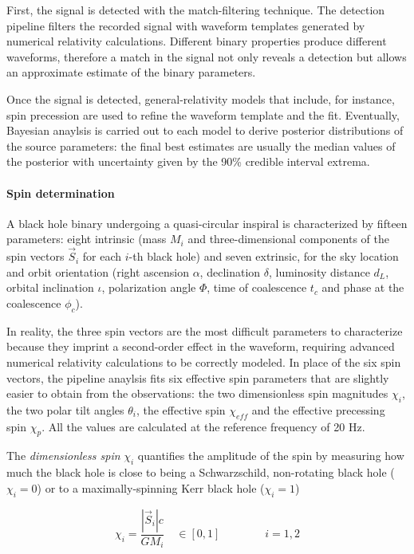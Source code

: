 \documentclass[a4paper,titlepage]{book}     	%
\begin{document}
First, the signal is detected with the match-filtering technique. The detection pipeline filters the recorded signal with waveform templates generated by numerical relativity calculations. Different binary properties produce different waveforms, therefore a match in the signal not only reveals a detection but allows an approximate estimate of the binary parameters.

Once the signal is detected, general-relativity models that include, for instance, spin precession are used to refine the waveform template and the fit. Eventually, Bayesian anaylsis is carried out to each model to derive posterior distributions of the source parameters: the final best estimates are usually the median values of the posterior with uncertainty given by the 90\% credible interval extrema.

\paragraph{Spin determination} A black hole binary undergoing a quasi-circular inspiral is characterized by fifteen parameters: eight intrinsic (mass $M_i$ and three-dimensional components of the spin vectors $\vec{S}_i$ for each $i$-th black hole) and seven extrinsic, for the sky location and orbit orientation (right ascension $\alpha$, declination $\delta$, luminosity distance $d_L$, orbital inclination $\iota$, polarization angle $\Phi$, time of coalescence $t_c$ and phase at the coalescence $\phi_c$). \cite{GWTC-1}

In reality, the three spin vectors are the most difficult parameters to characterize because they imprint a second-order effect in the waveform, requiring advanced numerical relativity calculations to be correctly modeled. In place of the six spin vectors, the pipeline anaylsis fits six effective spin parameters that are slightly easier to obtain from the observations: the two dimensionless spin magnitudes $\chi_i$, the two polar tilt angles $\theta_i$, the effective spin $\chi_{eff}$ and the effective precessing spin $\chi_p$. All the values are calculated at the reference frequency of 20 Hz.

The \emph{dimensionless spin} $\chi_i$ quantifies the amplitude of the spin by measuring how much the black hole is close to being a Schwarzschild, non-rotating black hole ($\chi_i = 0$) or to a maximally-spinning Kerr black hole ($\chi_i = 1$)

\begin{equation}\label{eq:chispin}
	\chi_i = \frac{|\vec{S}_i| c}{G M_i} \quad  \in [0,1]   \qquad \qquad i=1,2
\end{equation}
\end{document}
